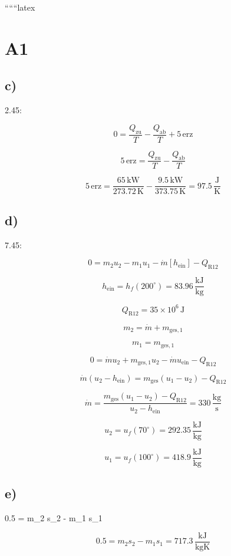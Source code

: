 ``````latex


\section*{A1}

\subsection*{c)}
2.45:

\[
0 = \frac{Q_{\text{zu}}}{T} - \frac{Q_{\text{ab}}}{T} + 5 \, \text{erz}
\]

\[
5 \, \text{erz} = \frac{Q_{\text{zu}}}{T} - \frac{Q_{\text{ab}}}{T}
\]

\[
5 \, \text{erz} = \frac{65 \, \text{kW}}{273.72 \, \text{K}} - \frac{9.5 \, \text{kW}}{373.75 \, \text{K}} = 97.5 \, \frac{\text{J}}{\text{K}}
\]

\subsection*{d)}
7.45:

\[
0 = m_2 u_2 - m_1 u_1 - \dot{m} \left[ h_{\text{ein}} \right] - Q_{\text{R12}}
\]

\[
h_{\text{ein}} = h_f (200^\circ) = 83.96 \, \frac{\text{kJ}}{\text{kg}}
\]

\[
Q_{\text{R12}} = 35 \times 10^6 \, \text{J}
\]

\[
m_2 = \dot{m} + m_{\text{ges},1}
\]

\[
m_1 = m_{\text{ges},1}
\]

\[
0 = \dot{m} u_2 + m_{\text{ges},1} u_2 - \dot{m} u_{\text{ein}} - Q_{\text{R12}}
\]

\[
\dot{m} (u_2 - h_{\text{ein}}) = m_{\text{ges}} (u_1 - u_2) - Q_{\text{R12}}
\]

\[
\dot{m} = \frac{m_{\text{ges}} (u_1 - u_2) - Q_{\text{R12}}}{u_2 - h_{\text{ein}}} = 330 \, \frac{\text{kg}}{\text{s}}
\]

\[
u_2 = u_f (70^\circ) = 292.35 \, \frac{\text{kJ}}{\text{kg}}
\]

\[
u_1 = u_f (100^\circ) = 418.9 \, \frac{\text{kJ}}{\text{kg}}
\]

\subsection*{e)}
0.5 = m_2 s_2 - m_1 s_1

\[
0.5 = m_2 s_2 - m_1 s_1 = 717.3 \, \frac{\text{kJ}}{\text{kgK}}
\]

